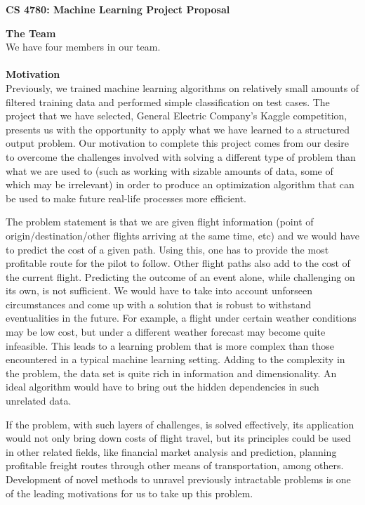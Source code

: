 \documentclass{article}[9pt]
\begin{document}
\begin{framed}
\noindent
\large{\textbf{CS 4780: Machine Learning \hfill Project Proposal}}
\end{framed}

\noindent\Large{\textbf{The Team}}\\
\noindent We have four members in our team.\\\\
\noindent\Large{\textbf{Motivation}}\\
\noindent Previously, we trained machine learning algorithms on relatively small amounts of filtered training data and performed simple classification on test cases. The project that we have selected, General Electric Company's Kaggle competition, presents us with the opportunity to apply what we have learned to a structured output problem. Our motivation to complete this project comes from our desire to overcome the challenges involved with solving a different type of problem than what we are used to (such as working with sizable amounts of data, some of which may be irrelevant) in order to produce an optimization algorithm that can be used to make future real-life processes more efficient.

The problem statement is that we are given flight information (point of origin/destination/other flights arriving at the same time, etc) and we would have to predict the cost of a given path. Using this, one has to provide the most profitable route for the pilot to follow. Other flight paths also add to the cost of the current flight. Predicting the outcome of an event alone, while challenging on its own, is not sufficient. We would have to take into account unforseen circumstances and come up with a solution that is robust to withstand eventualities in the future. For example, a flight under certain weather conditions may be low cost, but under a different weather forecast may become quite infeasible. This leads to a learning problem that is more complex than those encountered in a typical machine learning setting. Adding to the complexity in the problem, the data set is quite rich in information and dimensionality. An ideal algorithm would have to bring out the hidden dependencies in such unrelated data.

If the problem, with such layers of challenges, is solved effectively, its application would not only bring down costs of flight travel, but its principles could be used in other related fields, like financial market analysis and prediction, planning profitable freight routes through other means of transportation, among others. Development of novel methods to unravel previously intractable problems is one of the leading motivations for us to take up this problem.
\end{document}
